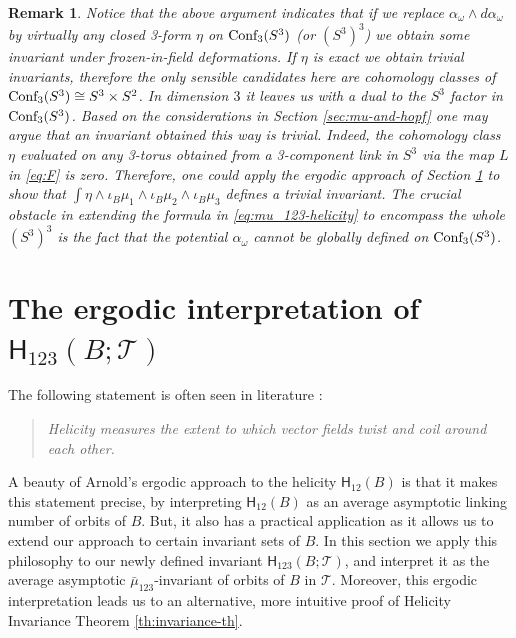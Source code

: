 \documentclass[12pt]{article}
\numberwithin{equation}{section}
\newtheorem{rem}[theorem]{Remark}
\newenvironment{remark}{\begin{rem} \rm}{\end{rem}}
\newcommand{\Cnf}{\text{\rm Conf}}
\newcommand{\no}{\noindent}
\begin{document}
\begin{remark}
 Notice that the above argument indicates that if we replace $\alpha_{\omega}\wedge d\alpha_\omega$ by virtually any closed 3-form $\eta$ on $\Cnf_3(S^3)$ (or $(S^3)^3$) we obtain some invariant under frozen-in-field deformations. If $\eta$ is exact we obtain trivial invariants, therefore the only sensible candidates here are cohomology classes of $\Cnf_3(S^3)\cong S^3\times S^2$. In dimension $3$ it leaves us with a dual to the $S^3$ factor in $\Cnf_3(S^3)$. Based on the considerations in Section \ref{sec:mu-and-hopf}
  one may argue that an invariant obtained this way is trivial. Indeed, the cohomology class $\eta$ evaluated on any 3-torus obtained from a 3-component link in $S^3$ via the map $L$ in \eqref{eq:F}
  is zero. Therefore, one could apply the ergodic approach of Section \ref{sec:ergodic} to show that $\int \eta\wedge\iota_{B}\mu_1\wedge \iota_{B}\mu_2\wedge \iota_{B}\mu_3$ 
 defines a trivial invariant.
  The crucial obstacle in extending the formula in \eqref{eq:mu_123-helicity} to encompass the whole $(S^3)^3$ is the fact that the potential $\alpha_\omega$ cannot be globally defined on $\Cnf_3(S^3)$.
\end{remark}


\section{The ergodic interpretation of  \texorpdfstring{$\mathsf{H}_{123}(B;\mathcal{T})$}{H-123}}\label{sec:ergodic}

The following statement is often seen in literature \cite{Cantarella-DeTurck-Gluck01, Cantarella-DeTurck-Gluck-Teytel00}: 

\begin{quote}
\emph{Helicity measures the extent to which 
vector fields twist and coil around each other.}
\end{quote}

\no A beauty of Arnold's ergodic approach 
to the helicity $\mathsf{H}_{12}(B)$ is that it makes this statement precise, by interpreting 
$\mathsf{H}_{12}(B)$ as an average asymptotic linking number of orbits of $B$. But, it also has a
practical application as it allows us to extend our approach to certain invariant sets of $B$. In this section we apply 
this philosophy to our newly defined invariant $\mathsf{H}_{123}(B;\mathcal{T})$, and interpret it
as the average asymptotic $\bar{\mu}_{123}$-invariant of orbits of $B$ in $\mathcal{T}$. 
Moreover, this ergodic interpretation leads us to an alternative, more intuitive proof of Helicity Invariance Theorem \ref{th:invariance-th}.
\end{document}
